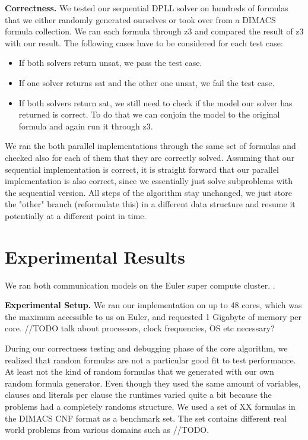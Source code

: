 \documentclass[letterpaper]{article}
\newcommand{\mypar}[1]{{\bf #1.}}
\begin{document}
\mypar{Correctness}
We tested our sequential DPLL solver on hundreds of formulas that we either randomly generated ourselves or took over from a DIMACS formula collection. \cite{cnf_website}
We ran each formula through z3 \cite{z3} and compared the result of z3 with our result.
The following cases have to be considered for each test case:
\begin{itemize}
    \item If both solvers return unsat, we pass the test case.
    \item If one solver returns sat and the other one unsat, we fail the test case.
    \item If both solvers return sat, we still need to check if the model our solver has returned is correct.
        To do that we can conjoin the model to the original formula and again run it through z3.
\end{itemize}

We ran the both parallel implementations through the same set of formulas and checked also for each of them that they are correctly solved.
Assuming that our sequential implementation is correct, it is straight forward that our parallel implementation is also correct, since we essentially just solve subproblems with the sequential version.
All steps of the algorithm stay unchanged, we just store the "other" branch (reformulate this) in a different data structure and resume it potentially at a different point in time.


\section{Experimental Results}\label{sec:exp}

We ran both communication models on the Euler super compute cluster. \cite{euler}.

\mypar{Experimental Setup}
We ran our implementation on up to 48 cores, which was the maximum accessible to us on Euler, and requested 1 Gigabyte of memory per core.
//TODO talk about processors, clock frequencies, OS etc necessary?

During our correctness testing and debugging phase of the core algorithm, we realized that random formulas are not a particular good fit to test performance.
At least not the kind of random formulas that we generated with our own random formula generator.
Even though they used the same amount of variables, clauses and literals per clause the runtimes varied quite a bit because the problems had a completely randoms structure.
We used a set of XX formulas in the DIMACS CNF format as a benchmark set.
The set contains different real world problems from various domains such as //TODO.
\end{document}
